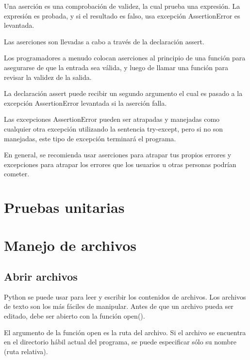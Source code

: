\documentclass{report}
\begin{document}
{Una aserción es una comprobación de validez, la cual prueba una expresión. La expresión es probada, y si el resultado es falso, usa excepción AssertionError es levantada.

Las aserciones son llevadas a cabo a través de la declaración assert.


Los programadores a menudo colocan aserciones al principio de una función para asegurarse de que la entrada sea válida, y luego de llamar una función para revisar la validez de la salida.

La declaración assert puede recibir un segundo argumento el cual es pasado a la excepción AssertionError levantada si la aserción falla.


Las excepciones AssertionError pueden ser atrapadas y manejadas como cualquier otra excepción utilizando la sentencia try-except, pero si no son manejadas, este tipo de excepción terminará el programa.

En general, se recomienda usar aserciones para atrapar tus propios errores y excepciones para atrapar los errores que los usuarios u otras personas podrían cometer.


\clearpage\chapter{Pruebas unitarias}

\clearpage\chapter{Manejo de archivos}

\section{Abrir archivos}

Python se puede usar para leer y escribir los contenidos de archivos. Los archivos de texto son los más fáciles de manipular.
Antes de que un archivo pueda ser editado, debe ser abierto con la función open().


El argumento de la función open es la ruta del archivo. Si el archivo se encuentra en el directorio hábil actual del programa, se puede especificar sólo su nombre (ruta relativa).

}
\end{document}
